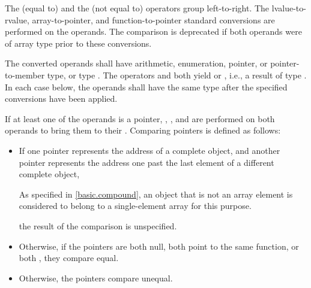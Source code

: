 \pnum
The \tcode{==} (equal to) and the \tcode{!=} (not equal to) operators
group left-to-right.
The
lvalue-to-rvalue,
array-to-pointer,
and function-to-pointer
standard conversions are performed on the operands.
The comparison is deprecated if
both operands were of array type
prior to these conversions.

\pnum
The converted operands shall have arithmetic, enumeration, pointer,
or pointer-to-member type, or type . The operators
\tcode{==} and \tcode{!=} both yield  or , i.e., a
result of type . In each case below, the operands shall have the
same type after the specified conversions have been applied.

\pnum
{}%
%
If at least one of the operands is a pointer,
,
, and
are performed on both operands to bring them to their .
Comparing pointers is defined as follows:
\begin{itemize}
\item
If one pointer represents the address of a complete object, and another
pointer represents the address one past the last element of a different
complete object,
\begin{footnote}
As specified in \ref{basic.compound},
an object that is not an array element is
considered to belong to a single-element array for this purpose.
\end{footnote}
the result of the comparison is unspecified.
\item
Otherwise, if the pointers are both null, both point to the same
%
function, or both
,
they compare equal.
\item
Otherwise, the pointers compare unequal.
\end{itemize}

